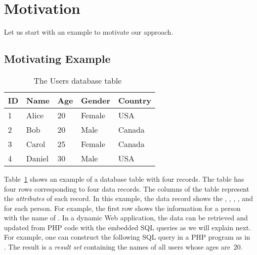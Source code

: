 \section{Motivation}

Let us start with an example to motivate our
approach. 

\subsection{Motivating Example}

\begin{table}
    \centering
    \small
    \caption{The \textsf{Users} database table~\cite{icsm13}}\label{tab:users-table}
\begin{tabular}{lllll}
  \addlinespace
  \toprule
  \textbf{ID} & \textbf{Name} & \textbf{Age} & \textbf{Gender} & \textbf{Country} \\
  \midrule
  1 & Alice & 20 & Female & USA \\
  2 & Bob & 20 & Male & Canada \\
  3 & Carol & 25 & Female & Canada \\
  4 & Daniel & 30 & Male & USA \\
  \bottomrule
\end{tabular}
\end{table}

Table~\ref{tab:users-table} shows an example of a database table with
four records. The table  has four rows corresponding to
four data records. The columns of the table represent the {\em
  attributes} of each record. In this example, the data record shows
the , , , , and
 for each person. For example, the first row shows the
information for a person with the name of . In a dynamic
Web application, the data can be retrieved and updated from PHP code
with the embedded SQL queries as we will explain next. For example,
one can construct the following SQL query in a PHP program as in
. The result is a {\em
  result set} containing the names of all users whose ages are~20.


